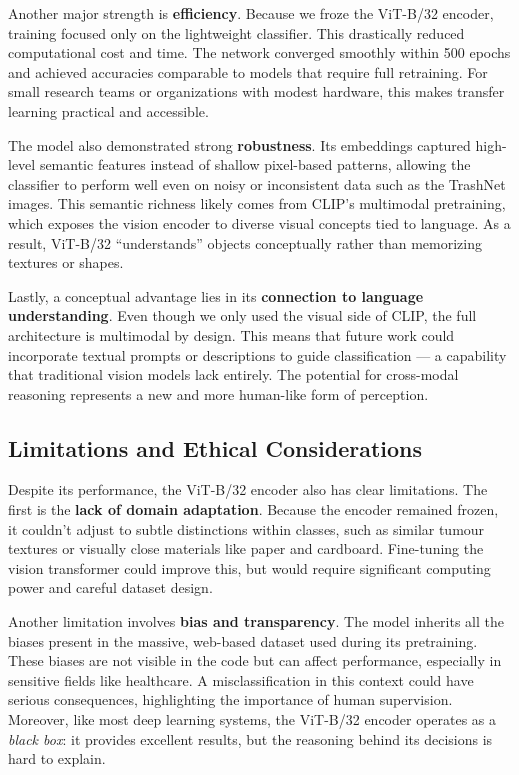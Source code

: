 \documentclass[12pt]{article}
\begin{document}
Another major strength is \textbf{efficiency}. Because we froze the ViT-B/32 encoder, training focused only on the lightweight classifier. This drastically reduced computational cost and time. The network converged smoothly within 500 epochs and achieved accuracies comparable to models that require full retraining. For small research teams or organizations with modest hardware, this makes transfer learning practical and accessible.

The model also demonstrated strong \textbf{robustness}. Its embeddings captured high-level semantic features instead of shallow pixel-based patterns, allowing the classifier to perform well even on noisy or inconsistent data such as the TrashNet images. This semantic richness likely comes from CLIP’s multimodal pretraining, which exposes the vision encoder to diverse visual concepts tied to language. As a result, ViT-B/32 “understands” objects conceptually rather than memorizing textures or shapes.

Lastly, a conceptual advantage lies in its \textbf{connection to language understanding}. Even though we only used the visual side of CLIP, the full architecture is multimodal by design. This means that future work could incorporate textual prompts or descriptions to guide classification — a capability that traditional vision models lack entirely. The potential for cross-modal reasoning represents a new and more human-like form of perception.

\subsection{Limitations and Ethical Considerations}
Despite its performance, the ViT-B/32 encoder also has clear limitations. The first is the \textbf{lack of domain adaptation}. Because the encoder remained frozen, it couldn’t adjust to subtle distinctions within classes, such as similar tumour textures or visually close materials like paper and cardboard. Fine-tuning the vision transformer could improve this, but would require significant computing power and careful dataset design.

Another limitation involves \textbf{bias and transparency}. The model inherits all the biases present in the massive, web-based dataset used during its pretraining. These biases are not visible in the code but can affect performance, especially in sensitive fields like healthcare. A misclassification in this context could have serious consequences, highlighting the importance of human supervision. Moreover, like most deep learning systems, the ViT-B/32 encoder operates as a \textit{black box}: it provides excellent results, but the reasoning behind its decisions is hard to explain.
\end{document}
